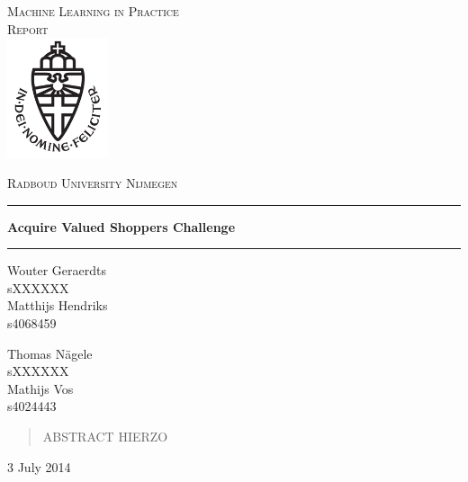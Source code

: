 \documentclass[a4paper]{article}
\begin{document}
\begin{titlepage}
	\begin{center}
	\textsc{\LARGE Machine Learning in Practice\\}
	\textsc{\Large Report}\\[1.5cm]
	\includegraphics[height=100pt]{logo}
   
	\vspace{0.4cm}
	\textsc{\Large Radboud University Nijmegen}\\[.5cm]
	\hrule
	\vspace{0.4cm}
	\textbf{\huge Acquire Valued Shoppers Challenge}\\[0.4cm]
	\hrule
	\vspace{2cm}
	\begin{minipage}[t]{0.45\textwidth}
	\begin{flushleft} \large
	Wouter Geraerdts\\
	sXXXXXX\\[0.7cm]
	Matthijs Hendriks\\
	s4068459\\[0.7cm]
	\end{flushleft}
	\end{minipage}
	\begin{minipage}[t]{0.45\textwidth}
	\begin{flushright} \large
	Thomas N\"agele\\
	sXXXXXX\\[0.7cm]
	Mathijs Vos\\
	s4024443\\[0.7cm]
	\end{flushright}
	\end{minipage}
	\vspace{.7cm}
	
	\begin{abstract}
		ABSTRACT HIERZO
	\end{abstract}
	\vspace{.7cm}

	{\large 3 July 2014}
	\vfill
	\end{center}

\end{titlepage}
\end{document}
